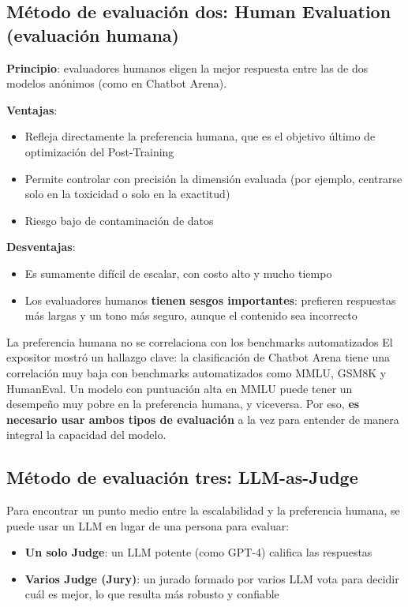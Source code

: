 \subsection{Método de evaluación dos: Human Evaluation (evaluación humana)}

\textbf{Principio}: evaluadores humanos eligen la mejor respuesta entre las de dos modelos anónimos (como en Chatbot Arena).

\textbf{Ventajas}:
\begin{itemize}
    \item Refleja directamente la preferencia humana, que es el objetivo último de optimización del Post-Training
    \item Permite controlar con precisión la dimensión evaluada (por ejemplo, centrarse solo en la toxicidad o solo en la exactitud)
    \item Riesgo bajo de contaminación de datos
\end{itemize}

\textbf{Desventajas}:
\begin{itemize}
    \item Es sumamente difícil de escalar, con costo alto y mucho tiempo
    \item Los evaluadores humanos \textbf{tienen sesgos importantes}: prefieren respuestas más largas y un tono más seguro, aunque el contenido sea incorrecto
\end{itemize}

\begin{warningbox}{La preferencia humana no se correlaciona con los benchmarks automatizados}
El expositor mostró un hallazgo clave: la clasificación de Chatbot Arena tiene una correlación muy baja con benchmarks automatizados como MMLU, GSM8K y HumanEval. Un modelo con puntuación alta en MMLU puede tener un desempeño muy pobre en la preferencia humana, y viceversa. Por eso, \textbf{es necesario usar ambos tipos de evaluación} a la vez para entender de manera integral la capacidad del modelo.
\end{warningbox}

\subsection{Método de evaluación tres: LLM-as-Judge}

Para encontrar un punto medio entre la escalabilidad y la preferencia humana, se puede usar un LLM en lugar de una persona para evaluar:

\begin{itemize}
    \item \textbf{Un solo Judge}: un LLM potente (como GPT-4) califica las respuestas
    \item \textbf{Varios Judge (Jury)}: un jurado formado por varios LLM vota para decidir cuál es mejor, lo que resulta más robusto y confiable
\end{itemize}

